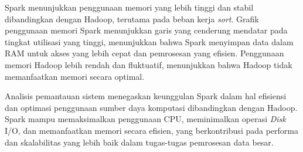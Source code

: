 Spark menunjukkan penggunaan memori yang lebih tinggi dan stabil dibandingkan dengan Hadoop, terutama pada beban kerja \textit{sort}. Grafik penggunaan memori Spark menunjukkan garis yang cenderung mendatar pada tingkat utilisasi yang tinggi, menunjukkan bahwa Spark menyimpan data dalam RAM untuk akses yang lebih cepat dan pemrosesan yang efisien. Penggunaan memori Hadoop lebih rendah dan fluktuatif, menunjukkan bahwa Hadoop tidak memanfaatkan memori secara optimal. 

Analisis pemantauan sistem menegaskan keunggulan Spark dalam hal efisiensi dan optimasi penggunaan sumber daya komputasi dibandingkan dengan Hadoop. Spark mampu memaksimalkan penggunaan CPU, meminimalkan operasi \textit{Disk} I/O, dan memanfaatkan memori secara efisien, yang berkontribusi pada performa dan skalabilitas yang lebih baik dalam tugas-tugas pemrosesan data besar.

